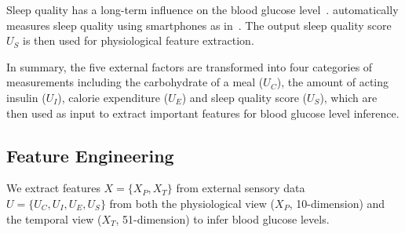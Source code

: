 Sleep quality has a long-term influence on the blood glucose level~\cite{bib:DRCP15:Iwasaki}.
\sysname automatically measures sleep quality using smartphones as in~\cite{bib:UbiComp14:Gu}.
The output sleep quality score $U_S$ is then used for physiological feature extraction.

In summary, the five external factors are transformed into four categories of measurements including the carbohydrate of a meal ($U_C$), the amount of acting insulin ($U_I$), calorie expenditure ($U_E$) and sleep quality score ($U_S$), which are then used as input to extract important features for blood glucose level inference.

\subsection{Feature Engineering}
\label{subsec:features}
We extract features $X=\{X_P, X_T\}$ from external sensory data $U=\{U_C, U_I, U_E, U_S\}$ from both the physiological view ($X_P$, 10-dimension) and the temporal view ($X_T$, 51-dimension) to infer blood glucose levels. 

